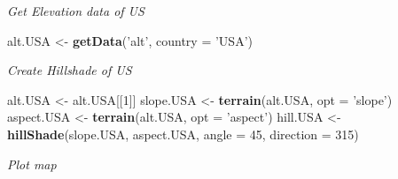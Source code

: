 \documentclass[author-year, review, 11pt]{components/elsarticle} %
\newenvironment{Shaded}{\begin{snugshade}}{\end{snugshade}}
\newcommand{\KeywordTok}[1]{\textcolor[rgb]{0.13,0.29,0.53}{\textbf{#1}}}
\newcommand{\DataTypeTok}[1]{\textcolor[rgb]{0.13,0.29,0.53}{#1}}
\newcommand{\DecValTok}[1]{\textcolor[rgb]{0.00,0.00,0.81}{#1}}
\newcommand{\StringTok}[1]{\textcolor[rgb]{0.31,0.60,0.02}{#1}}
\newcommand{\NormalTok}[1]{#1}
\begin{document}
\emph{Get Elevation data of US}

\begin{Shaded}
\begin{Highlighting}[]
\NormalTok{alt.USA <-}\StringTok{ }\KeywordTok{getData}\NormalTok{(}\StringTok{'alt'}\NormalTok{, }\DataTypeTok{country =} \StringTok{'USA'}\NormalTok{)}
\end{Highlighting}
\end{Shaded}

\emph{Create Hillshade of US}

\begin{Shaded}
\begin{Highlighting}[]
\NormalTok{alt.USA <-}\StringTok{ }\NormalTok{alt.USA[[}\DecValTok{1}\NormalTok{]]}
\NormalTok{slope.USA <-}\StringTok{ }\KeywordTok{terrain}\NormalTok{(alt.USA, }\DataTypeTok{opt =} \StringTok{'slope'}\NormalTok{)}
\NormalTok{aspect.USA <-}\StringTok{ }\KeywordTok{terrain}\NormalTok{(alt.USA, }\DataTypeTok{opt =} \StringTok{'aspect'}\NormalTok{)}
\NormalTok{hill.USA <-}\StringTok{ }\KeywordTok{hillShade}\NormalTok{(slope.USA, aspect.USA, }\DataTypeTok{angle =} \DecValTok{45}\NormalTok{, }\DataTypeTok{direction =} \DecValTok{315}\NormalTok{)}
\end{Highlighting}
\end{Shaded}

\emph{Plot map}
\end{document}
